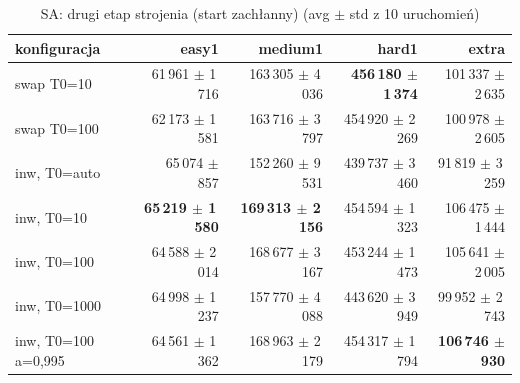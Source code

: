 \begin{table}[H]
  \centering
  \small
  \caption{SA: drugi etap strojenia (start zachłanny) (avg $\pm$ std z 10 uruchomień)}
  \label{tab:sa-kombinacje}
  \begin{tabular}{lrrrr}
    \toprule
    konfiguracja & easy1 & medium1 & hard1 & extra \\
    \midrule
    swap T0=10 & 61\,961 $\pm$ 1\,716 & 163\,305 $\pm$ 4\,036 & \textbf{456\,180 $\pm$ 1\,374} & 101\,337 $\pm$ 2\,635 \\
    swap T0=100 & 62\,173 $\pm$ 1\,581 & 163\,716 $\pm$ 3\,797 & 454\,920 $\pm$ 2\,269 & 100\,978 $\pm$ 2\,605 \\
    inw{,} T0=auto & 65\,074 $\pm$ 857 & 152\,260 $\pm$ 9\,531 & 439\,737 $\pm$ 3\,460 & 91\,819 $\pm$ 3\,259 \\
    inw{,} T0=10 & \textbf{65\,219 $\pm$ 1\,580} & \textbf{169\,313 $\pm$ 2\,156} & 454\,594 $\pm$ 1\,323 & 106\,475 $\pm$ 1\,444 \\
    inw{,} T0=100 & 64\,588 $\pm$ 2\,014 & 168\,677 $\pm$ 3\,167 & 453\,244 $\pm$ 1\,473 & 105\,641 $\pm$ 2\,005 \\
    inw{,} T0=1000 & 64\,998 $\pm$ 1\,237 & 157\,770 $\pm$ 4\,088 & 443\,620 $\pm$ 3\,949 & 99\,952 $\pm$ 2\,743 \\
    inw{,} T0=100 a=0{,}995 & 64\,561 $\pm$ 1\,362 & 168\,963 $\pm$ 2\,179 & 454\,317 $\pm$ 1\,794 & \textbf{106\,746 $\pm$ 930} \\
    \bottomrule
  \end{tabular}
\end{table}

